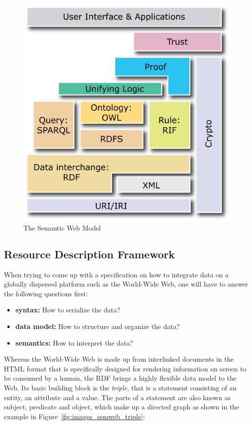 \begin{figure}[H]
	\centering
		\includegraphics[width=0.8\columnwidth]{images/semantic_web_layers.png}
	\caption[The Semantic Web Model]{The Semantic Web Model \citep{W3C2013}}
\label{fig:images_semweb_model}
\end{figure}


\subsection{Resource Description Framework}
\label{sec:semantic_rdf}

When trying to come up with a specification on how to integrate data on a globally dispersed platform such as the World-Wide Web, one will have to answer the following questions first: \@

\begin{itemize}
	\item \textbf{syntax:} How to serialize the data?
	\item \textbf{data model:} How to structure and organize the data?
	\item \textbf{semantics:} How to interpret the data?
\end{itemize}

Whereas the World-Wide Web is made up from interlinked documents in the \gls{HTML} format that is specifically designed for rendering information on screen to be consumed by a human, the \gls{RDF} brings a highly flexible data model to the Web. Its basic building block is the \emph{triple}, that is a statement consisting of an entity, an attribute and a value. The parts of a statement are also known as subject, predicate and object, which make up a directed graph as shown in the example in Figure~\ref{fig:images_semweb_triple}: \@

